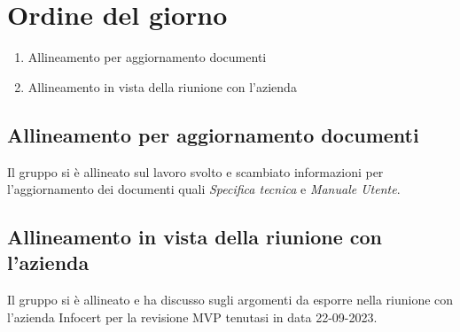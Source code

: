 \section{Ordine del giorno}
\begin{enumerate}
\item Allineamento per aggiornamento documenti
\item Allineamento in vista della riunione con l'azienda
\end{enumerate}

\subsection{Allineamento per aggiornamento documenti}
Il gruppo si è allineato sul lavoro svolto e scambiato informazioni per l'aggiornamento dei documenti quali \textit{Specifica tecnica} e \textit{Manuale Utente}. 
\subsection{Allineamento in vista della riunione con l'azienda}
Il gruppo si è allineato e ha discusso sugli argomenti da esporre nella riunione con l'azienda Infocert per la revisione MVP tenutasi in data 22-09-2023.